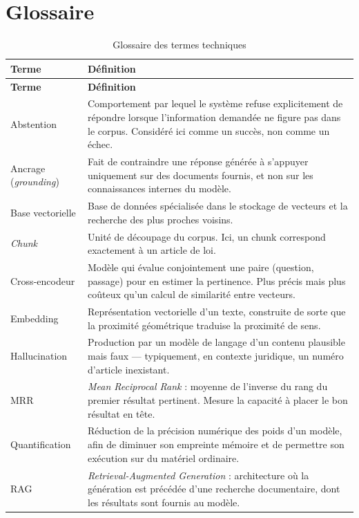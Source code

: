 \chapter{Glossaire}

\begin{longtable}[c]{| m{3.6cm} | m{11.4cm} |}
\caption{Glossaire des termes techniques}\\
\hline
\textbf{Terme} & \textbf{Définition} \\
\hline
\endfirsthead
\hline
\textbf{Terme} & \textbf{Définition} \\
\hline
\endhead
\hline
Abstention & Comportement par lequel le système refuse explicitement de répondre lorsque l'information demandée ne figure pas dans le corpus. Considéré ici comme un succès, non comme un échec. \\
\hline
Ancrage (\textit{grounding}) & Fait de contraindre une réponse générée à s'appuyer uniquement sur des documents fournis, et non sur les connaissances internes du modèle. \\
\hline
Base vectorielle & Base de données spécialisée dans le stockage de vecteurs et la recherche des plus proches voisins. \\
\hline
\textit{Chunk} & Unité de découpage du corpus. Ici, un chunk correspond exactement à un article de loi. \\
\hline
Cross-encodeur & Modèle qui évalue conjointement une paire (question, passage) pour en estimer la pertinence. Plus précis mais plus coûteux qu'un calcul de similarité entre vecteurs. \\
\hline
Embedding & Représentation vectorielle d'un texte, construite de sorte que la proximité géométrique traduise la proximité de sens. \\
\hline
Hallucination & Production par un modèle de langage d'un contenu plausible mais faux --- typiquement, en contexte juridique, un numéro d'article inexistant. \\
\hline
MRR & \textit{Mean Reciprocal Rank} : moyenne de l'inverse du rang du premier résultat pertinent. Mesure la capacité à placer le bon résultat en tête. \\
\hline
Quantification & Réduction de la précision numérique des poids d'un modèle, afin de diminuer son empreinte mémoire et de permettre son exécution sur du matériel ordinaire. \\
\hline
RAG & \textit{Retrieval-Augmented Generation} : architecture où la génération est précédée d'une recherche documentaire, dont les résultats sont fournis au modèle. \\

\end{longtable}

